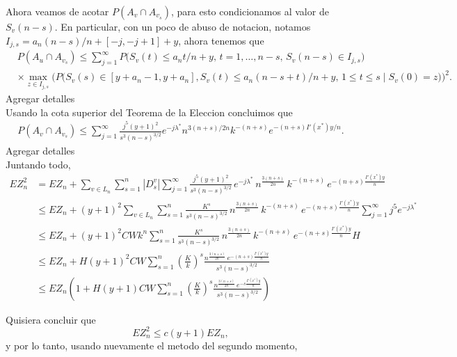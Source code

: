 \documentclass[12pt]{report}
\begin{document}
Ahora veamos de acotar $P(A_v \cap A_{v_s})$, para esto condicionamos al valor de $S_v (n-s)$. 
En particular, con un poco de abuso de notacion, notamos $I_{j,s} = a_n (n-s)/n + [-j,-j+1] + y$, ahora tenemos que
\begin{align}
&P(A_u \cap A_{v_s}) \leq \sum_{j=1}^{\infty} P\Big(S_v(t) \leq a_n t/n + y,\, t = 1, \ldots, n - s,\, S_v(n - s) \in I_{j,s}\Big) \nonumber \\
&\times \max_{z \in I_{j,s}} \Big(P\big(S_v(s) \in [y + a_n - 1, y + a_n],
S_v(t) \leq a_n(n - s + t)/n + y,\, 1 \leq t \leq s \mid S_v(0) = z\big)\Big)^2. \nonumber
\end{align}
Agregar detalles \\
Usando la cota superior del Teorema de la Eleccion concluimos que
\begin{align}
    P(A_v \cap A_{v_s}) \leq \sum_{j=1}^{\infty} 
\frac{j^5 (y + 1)^2}{s^3 (n - s)^{3/2}} 
e^{-j \lambda^*} 
n^{3(n + s)/2n} 
k^{-(n + s)} 
e^{-(n + s) I'(x^*) y / n}.
\end{align}
Agregar detalles\\

Juntando todo,
\begin{align*}
    EZ_n^2
    &= EZ_n + \sum_{v \in L_n} \sum_{s = 1}^{n} |D_s^v| \sum_{j=1}^{\infty} 
    \frac{j^5 (y + 1)^2}{s^3 (n - s)^{3/2}} \, e^{-j \lambda^*} \, n^{\frac{3(n + s)}{2n}} \, k^{-(n + s)} \, e^{-(n + s) \frac{I'(x^*) y}{n}} \\
    &\leq EZ_n + (y + 1)^2 \sum_{v \in L_n} \sum_{s = 1}^{n} \frac{K^s}{s^3 (n - s)^{3/2}} \, n^{\frac{3(n + s)}{2n}} \, k^{-(n + s)} \, e^{-(n + s) \frac{I'(x^*) y}{n}} \sum_{j=1}^{\infty} j^5 e^{-j \lambda^*} \\
    &\leq EZ_n + (y + 1)^2 C W k^n \sum_{s = 1}^{n} \frac{K^s}{s^3 (n - s)^{3/2}} \, n^{\frac{3(n + s)}{2n}} \, k^{-(n + s)} \, e^{-(n + s) \frac{I'(x^*) y}{n}} H \\
    &\leq EZ_n + H (y + 1)^2 C W \sum_{s = 1}^{n} \left(\frac{K}{k}\right)^s \frac{n^{\frac{3(n + s)}{2n}} \, e^{-(n + s) \frac{I'(x^*) y}{n}}}{s^3 (n - s)^{3/2}} \\
    &\leq EZ_n \left( 1 + H (y + 1) C W \sum_{s = 1}^{n} \left(\frac{K}{k}\right)^s \frac{n^{\frac{3(n + s)}{2n}} \, e^{-s \frac{I'(x^*) y}{n}}}{s^3 (n - s)^{3/2}} \right)
\end{align*}



Quisiera concluir que
\[
E Z_n^2 \leq c(y+1) E Z_n,
\]
y por lo tanto, usando nuevamente el metodo del segundo momento,
\end{document}

